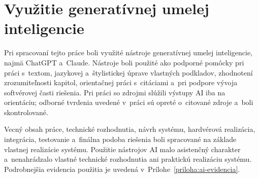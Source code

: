 \chapter*{Využitie generatívnej umelej inteligencie}

Pri spracovaní tejto práce boli využité nástroje generatívnej umelej
inteligencie, najmä ChatGPT a~Claude. Nástroje boli použité ako podporné
pomôcky pri práci s~textom, jazykovej a~štylistickej úprave vlastných
podkladov, zhodnotení zrozumiteľnosti kapitol, orientačnej práci
s~citáciami a~pri podpore vývoja softvérovej časti riešenia. Pri práci
so zdrojmi slúžili výstupy AI iba na orientáciu; odborné tvrdenia uvedené
v~práci sú opreté o~citované zdroje a~boli skontrolované.

Vecný obsah práce, technické rozhodnutia, návrh systému, hardvérová
realizácia, integrácia, testovanie a~finálna podoba riešenia boli
spracované na základe vlastnej realizácie systému. Použitie nástrojov AI
malo asistenčný charakter a~nenahrádzalo vlastné technické rozhodnutia
ani praktickú realizáciu systému. Podrobnejšia evidencia použitia je
uvedená v~Prílohe~\ref{priloha:ai-evidencia}.
